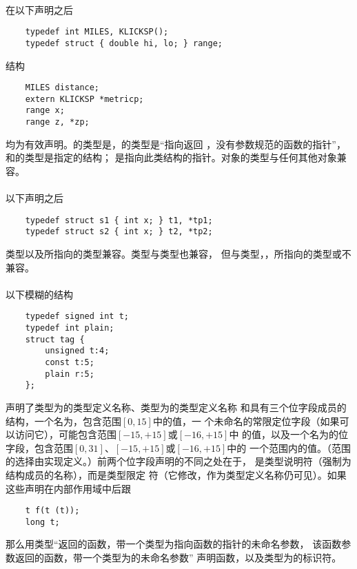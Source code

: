 \paragraph{}
\ex 在以下声明之后
\begin{lstlisting}
    typedef int MILES, KLICKSP();
    typedef struct { double hi, lo; } range;
\end{lstlisting}
结构
\begin{lstlisting}
    MILES distance;
    extern KLICKSP *metricp;
    range x;
    range z, *zp;
\end{lstlisting}
均为有效声明。的类型是，的类型是``指向返回
，没有参数规范的函数的指针''，和的类型是指定的结构；
是指向此类结构的指针。对象的类型与任何其他对象兼容。

\paragraph{}
\ex 以下声明之后
\begin{lstlisting}
    typedef struct s1 { int x; } t1, *tp1;
    typedef struct s2 { int x; } t2, *tp2;
\end{lstlisting}
类型以及所指向的类型兼容。类型与类型也兼容，
但与类型，，所指向的类型或不兼容。

\paragraph{}
\ex 以下模糊的结构
\begin{lstlisting}
    typedef signed int t;
    typedef int plain;
    struct tag {
        unsigned t:4;
        const t:5;
        plain r:5;
    };
\end{lstlisting}
声明了类型为的类型定义名称、类型为的类型定义名称
和具有三个位字段成员的结构，一个名为，包含范围$[0,15]$中的值，一
个未命名的常限定位字段（如果可以访问它），可能包含范围$[-15,+15]$或$[-16,+15]$中
的值，以及一个名为的位字段，包含范围$[0,31]$、$[-15,+15]$或$[-16,+15]$中的
一个范围内的值。（范围的选择由实现定义。）前两个位字段声明的不同之处在于，
是类型说明符（强制为结构成员的名称），而是类型限定
符（它修改，作为类型定义名称仍可见）。如果这些声明在内部作用域中后跟
\begin{lstlisting}
    t f(t (t));
    long t;
\end{lstlisting}
那么用类型``返回的函数，带一个类型为指向函数的指针的未命名参数，
该函数参数返回的函数，带一个类型为的未命名参数''
声明函数，以及类型为的标识符。

